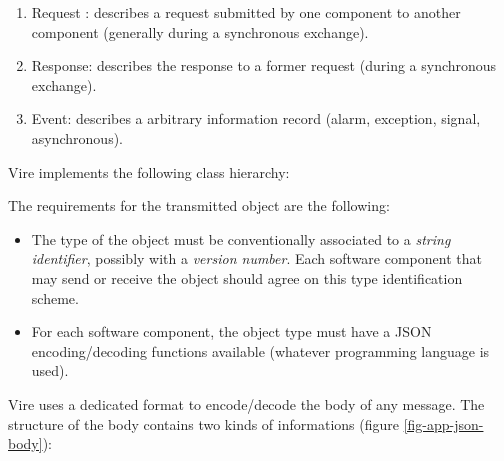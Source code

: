 \begin{enumerate}

\item Request : describes a request submitted by one component to another component
 (generally during a synchronous exchange).

\item Response: describes the response to a former request (during a synchronous exchange).

\item Event: describes a arbitrary information record (alarm, exception, signal,
asynchronous).

\end{enumerate}

Vire implements the following class hierarchy:

\begin{center}
\end{center}

The requirements for the transmitted object are the following:

\begin{itemize}

\item The  type of the object  must be conventionally associated  to a
  \textit{string identifier}, possibly with a \textit{version number}.
  Each software component  that may send or receive  the object should
  agree on this type identification scheme.

\item For  each software component, the  object type must have  a JSON
  encoding/decoding functions available (whatever programming language
  is used).

\end{itemize}

Vire uses a dedicated format to encode/decode the body of any message.
The structure of  the body contains two kinds  of informations (figure
\ref{fig-app-json-body}):


